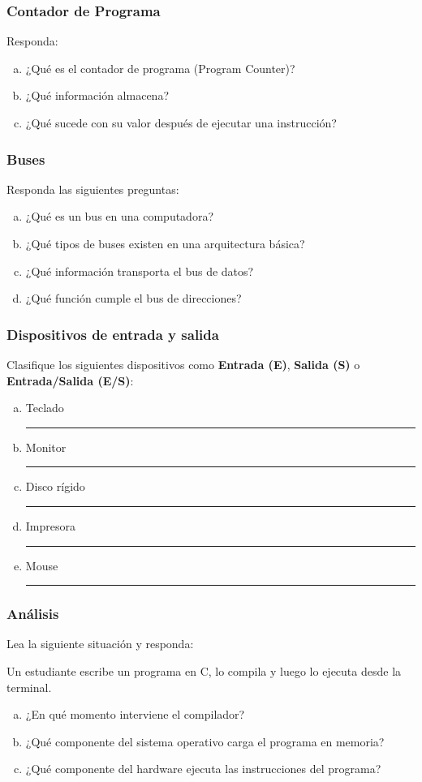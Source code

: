 \subsubsection{Contador de Programa}
Responda:
\begin{enumerate}[a)]
  \item ¿Qué es el contador de programa (Program Counter)?
  \item ¿Qué información almacena?
  \item ¿Qué sucede con su valor después de ejecutar una instrucción?
\end{enumerate}

\subsubsection{Buses}
Responda las siguientes preguntas:
\begin{enumerate}[a)]
  \item ¿Qué es un bus en una computadora?
  \item ¿Qué tipos de buses existen en una arquitectura básica?
  \item ¿Qué información transporta el bus de datos?
  \item ¿Qué función cumple el bus de direcciones?
\end{enumerate}

\subsubsection{Dispositivos de entrada y salida}
Clasifique los siguientes dispositivos como \textbf{Entrada (E)}, \textbf{Salida (S)} o \textbf{Entrada/Salida (E/S)}:

\begin{enumerate}[a)]
  \item Teclado \hfill \rule{2cm}{0.1pt}
  \item Monitor \hfill \rule{2cm}{0.1pt}
  \item Disco rígido \hfill \rule{2cm}{0.1pt}
  \item Impresora \hfill \rule{2cm}{0.1pt}
  \item Mouse \hfill \rule{2cm}{0.1pt}
\end{enumerate}

\subsubsection{Análisis}
Lea la siguiente situación y responda:

Un estudiante escribe un programa en C, lo compila y luego lo ejecuta desde la terminal.

\begin{enumerate}[a)]
  \item ¿En qué momento interviene el compilador?
  \item ¿Qué componente del sistema operativo carga el programa en memoria?
  \item ¿Qué componente del hardware ejecuta las instrucciones del programa?
\end{enumerate}